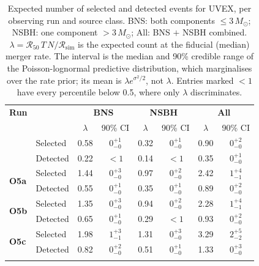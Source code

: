 \begin{table}
\renewcommand\arraystretch{1.3}
\setlength{\tabcolsep}{0.3cm}
\centering
\caption{Expected number of selected and detected events for UVEX, per observing run and source class. BNS: both components $\leq 3\,M_\odot$; NSBH: one component $> 3\,M_\odot$; All: BNS $+$ NSBH combined. $\lambda = \mathcal{R}_{50}\,T\,N / \mathcal{R}_{\mathrm{sim}}$ is the expected count at the fiducial (median) merger rate. The interval is the median and 90\% credible range of the Poisson-lognormal predictive distribution, which marginalises over the rate prior; its mean is $\lambda e^{\sigma^2/2}$, not $\lambda$. Entries marked $<1$ have every percentile below 0.5, where only $\lambda$ discriminates.}
\label{tab:uvex-selected-detected-1yr}
\begin{tabular}{llcccccc}
\Xhline{3\arrayrulewidth}
\textbf{Run} & & \multicolumn{2}{c}{\textbf{BNS}} & \multicolumn{2}{c}{\textbf{NSBH}} & \multicolumn{2}{c}{\textbf{All}} \\
 & & $\lambda$ & 90\% CI & $\lambda$ & 90\% CI & $\lambda$ & 90\% CI \\
\Xhline{3\arrayrulewidth}
\multirow{2}{*}{\textbf{IR1HLV}} & Selected & 0.58 & $0^{+1}_{-0}$ & 0.32 & $0^{+1}_{-0}$ & 0.90 & $0^{+2}_{-0}$ \\
 & Detected & 0.22 & $<1$ & 0.14 & $<1$ & 0.35 & $0^{+1}_{-0}$ \\
\hline
\multirow{2}{*}{\textbf{O5a}} & Selected & 1.44 & $0^{+3}_{-0}$ & 0.97 & $0^{+2}_{-0}$ & 2.42 & $1^{+4}_{-1}$ \\
 & Detected & 0.55 & $0^{+1}_{-0}$ & 0.35 & $0^{+1}_{-0}$ & 0.89 & $0^{+2}_{-0}$ \\
\hline
\multirow{2}{*}{\textbf{O5b}} & Selected & 1.35 & $0^{+3}_{-0}$ & 0.94 & $0^{+2}_{-0}$ & 2.28 & $1^{+4}_{-1}$ \\
 & Detected & 0.65 & $0^{+1}_{-0}$ & 0.29 & $<1$ & 0.93 & $0^{+2}_{-0}$ \\
\hline
\multirow{2}{*}{\textbf{O5c}} & Selected & 1.98 & $1^{+3}_{-1}$ & 1.31 & $0^{+3}_{-0}$ & 3.29 & $2^{+5}_{-2}$ \\
 & Detected & 0.82 & $0^{+2}_{-0}$ & 0.51 & $0^{+1}_{-0}$ & 1.33 & $0^{+3}_{-0}$ \\
\Xhline{3\arrayrulewidth}
\end{tabular}
\end{table}

